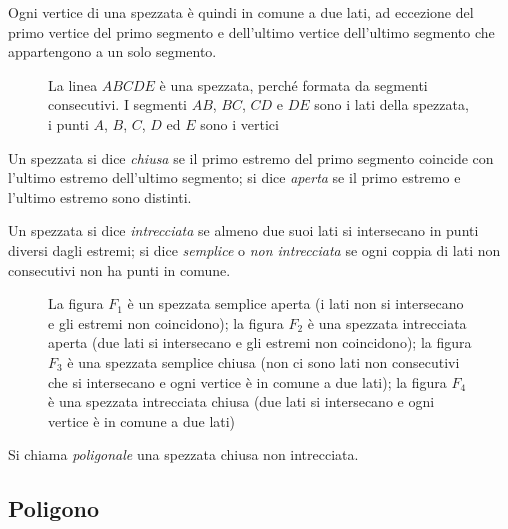 Ogni vertice di una spezzata è quindi in comune a due lati, ad 
eccezione del primo vertice del primo segmento e dell'ultimo vertice 
dell'ultimo segmento che appartengono a un solo segmento.


\begin{inaccessibleblock}
 \begin{figure}[htb]
\centering
\caption{La linea $ABCDE$ è una spezzata, perché formata da segmenti 
consecutivi. I segmenti $AB$, $BC$, $CD$ e $DE$ sono i lati della 
spezzata, i punti $A$, $B$, $C$, $D$ ed $E$ sono i vertici}
\end{figure}
\end{inaccessibleblock}

\begin{definizione}
Un spezzata si dice \emph{chiusa} se il primo estremo del primo 
segmento coincide con l'ultimo estremo dell'ultimo segmento; si dice 
\emph{aperta} se il primo estremo e l'ultimo estremo sono distinti.
\end{definizione}

\begin{definizione}
Un spezzata si dice \emph{intrecciata} se almeno due suoi lati si 
intersecano in punti diversi dagli estremi; si dice \emph{semplice} o 
\emph{non intrecciata} se ogni coppia di lati non consecutivi non ha 
punti in comune.
\end{definizione}


\begin{inaccessibleblock}
 \begin{figure}[htb]
\centering
\caption{La figura $F_1$ è un spezzata semplice aperta (i lati non si 
intersecano e gli estremi non coincidono); la figura $F_2$ è una 
spezzata intrecciata aperta (due lati si intersecano e gli estremi 
non coincidono); la figura $F_3$ è una spezzata semplice chiusa (non 
ci sono lati non consecutivi che si intersecano e ogni vertice è in 
comune a due lati); la figura $F_4$ è una spezzata intrecciata chiusa 
(due lati si intersecano e ogni vertice è in comune a due lati)}
\end{figure}
\end{inaccessibleblock}

\begin{definizione}
Si chiama \emph{poligonale} una spezzata chiusa non intrecciata.
\end{definizione}

\subsection{Poligono}

